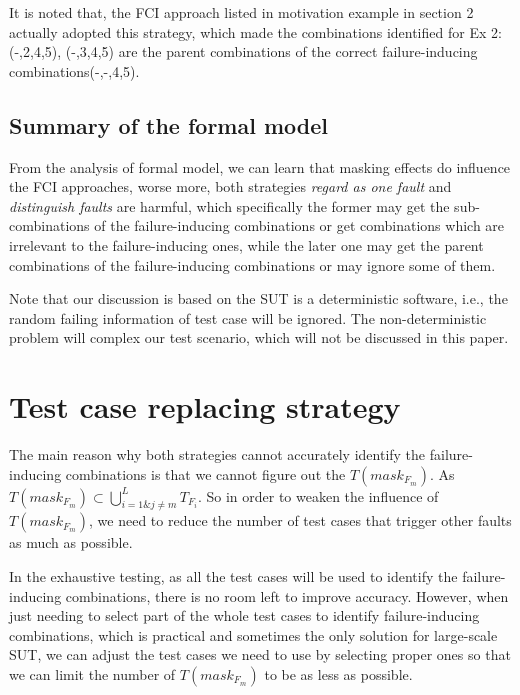 \documentclass{sig-alternate}
\begin{document}
It is noted that, the FCI approach listed in motivation example in section 2 actually adopted this strategy, which made the combinations identified for Ex 2: (-,2,4,5), (-,3,4,5) are the parent combinations of the correct failure-inducing combinations(-,-,4,5).

\subsection{Summary of the formal model}
From the analysis of formal model, we can learn that masking effects do influence the FCI approaches, worse more, both strategies \emph{regard as one fault} and \emph{distinguish faults} are harmful, which specifically the former may get the sub-combinations of the failure-inducing combinations or get combinations which are irrelevant to the failure-inducing ones, while the later one may get the parent combinations of the failure-inducing combinations or may ignore some of them.

Note that our discussion is based on the SUT is a deterministic software, i.e., the random failing information of test case will be ignored. The non-deterministic problem will complex our test scenario, which will not be discussed in this paper.

\section{Test case replacing strategy}
The main reason why both strategies cannot accurately identify the failure-inducing combinations is that we cannot figure out the $T(mask_{F_{m}})$.  As $T(mask_{F_{m}}) \subset \bigcup_{i = 1 \& j \neq m }^{L}T_{F_{i}}$. So in order to weaken the influence of $T(mask_{F_{m}})$, we need to reduce the number of test cases that trigger other faults as much as possible.

In the exhaustive testing, as all the test cases will be used to identify the failure-inducing combinations, there is no room left to improve accuracy. However, when just needing to select part of the whole test cases to identify failure-inducing combinations, which is practical and sometimes the only solution for large-scale SUT, we can adjust the test cases we need to use by selecting proper ones so that we can limit the number of $T(mask_{F_{m}})$ to be as less as possible.
\end{document}
